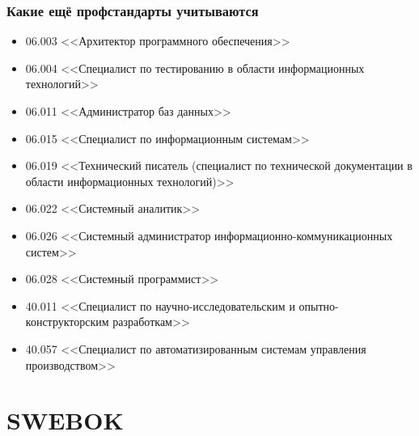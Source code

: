 \documentclass{../../slides-style}
\begin{document}
    \begin{frame}
        \frametitle{Какие ещё профстандарты учитываются}
        \begin{footnotesize}
            \begin{itemize}
                \item 06.003 <<Архитектор программного обеспечения>>
                \item 06.004 <<Специалист по тестированию в области информационных технологий>>
                \item 06.011 <<Администратор баз данных>>
                \item 06.015 <<Специалист по информационным системам>>
                \item 06.019 <<Технический писатель (специалист по технической документации в области информационных технологий)>>
                \item 06.022 <<Системный аналитик>>
                \item 06.026 <<Системный администратор информационно-коммуникационных систем>>
                \item 06.028 <<Системный программист>>
                \item 40.011 <<Специалист по научно-исследовательским и опытно-конструкторским разработкам>>
                \item 40.057 <<Специалист по автоматизированным системам управления производством>>
            \end{itemize}
        \end{footnotesize}
    \end{frame}

    \section{SWEBOK}
\end{document}
